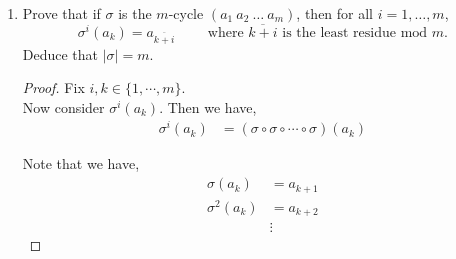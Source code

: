 \documentclass[11pt, reqno]{amsart}
\theoremstyle{plain}
\theoremstyle{definition}
\theoremstyle{example}
\newenvironment{ans}{\color{black}\medskip \paragraph*{\emph{Answer}.}}{\hfill \break  $~\!\!$ \dotfill \medskip }
\begin{document}
\begin{enumerate}[1.]
\begin{enumerate}
\begin{enumerate}
\begin{ans}
	\begin{align*}
	\gamma^6 &= \gamma \circ \gamma^5\\
	&= (1~2~3~4~5~6~7~8) \circ (1~6~3~8~5~2~7~4)\\
	&= (1~7~5~3)(2~8~6~4)
	\end{align*}
	
	\begin{align*}
	\gamma^7 &= \gamma \circ \gamma^6\\
	&= (1~2~3~4~5~6~7~8) \circ (1~7~5~3)(2~8~6~4)\\
	&= (1~8~7~6~5~4~3~2~1)
	\end{align*}
	
	\begin{align*}
	\gamma^8 &= \gamma \circ \gamma^7\\
	&= (1~2~3~4~5~6~7~8) \circ (1~8~7~6~5~4~3~2~1)\\
	&= 1
	\end{align*}
	
	So we have that $\gamma^i$ is an 8-cycle if $i \in \{1, 3, 5, 7\}$.
	\end{ans}
	
	\item What's the theorem in general? \\
	\centerline{\emph{If $\sigma$ is an $m$-cycle, then $\sigma^i$ is also an $m$-cycle if and only if \dots}}
	(Just state, don't prove it.)
	
	\begin{ans}
	If $\sigma$ is an m-cycle, then $\sigma^i$ is also an m-cycle if and only if $i \equiv r \mod m$ with $r$ and $m$ relatively prime.
	\end{ans}
	\end{enumerate}

	\item Prove that if $\sigma$ is the $m$-cycle $(a_1~a_2~\dots~a_m)$, then for all $i =1, \dots, m$, 
$$\sigma^i(a_k) = a_{\overline{k+{i}}} \qquad \text{ where $\overline{k+{i}}$ is the least residue mod $m$.}$$
Deduce that $|\sigma|=m$. 

	\begin{proof}
	Fix $i, k \in \{1, \cdots, m\}$.\\
	
	Now consider $\sigma^i(a_k)$. Then we have,
	\begin{align*}
	\sigma^i(a_k) &= (\sigma \circ \sigma \circ \cdots \circ \sigma)(a_k)
	\end{align*}
	
	Note that we have,
	\begin{align*}
	\sigma(a_k) &= a_{k+1}\\
	\sigma^2(a_k) &= a_{k+2}\\
	&\vdots
	\end{align*}
	

\end{proof}
\end{enumerate}
\end{enumerate}
\end{document}
